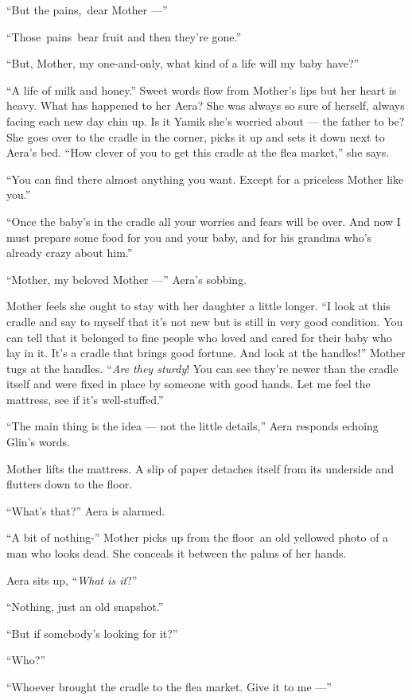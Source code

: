 \documentclass[twoside,11pt]{book}
\begin{document}
``But the pains,~dear Mother ---''

``Those~pains~bear fruit and then they're gone.''

``But, Mother, my one-and-only, what kind of a life will my baby have?''

``A life of milk and honey.'' Sweet words flow from Mother's lips but her heart is heavy. What
has happened to her Aera? She was always so sure of herself, always facing each new day chin up. Is it Yamik she's
worried about --- the father to be? She goes over to the cradle in the corner, picks it up and sets it down next to
Aera's bed. ``How clever of you to get this cradle at the flea market,'' she says.

``You can find there almost anything you want. Except for a priceless Mother like you.''

``Once the baby's in the cradle all your worries and fears will be over. And now I must prepare some food
for you and your baby, and for his grandma who's already crazy about him.''

``Mother, my beloved Mother ---'' Aera's  sobbing.

Mother feels she ought to stay with her daughter a little longer. ``I look at this cradle and say to myself
that it's not new but is{ }still in very good condition. You can tell that it belonged to fine people
who loved and cared for their baby who lay in it. It's a cradle that brings good fortune. And look at the
handles!'' Mother tugs at the handles. ``\textit{Are they sturdy}! You can see they're newer
than the cradle itself and were fixed in place by someone with good hands. Let me feel the mattress, see if it's
well-stuffed.''

``The main thing is the idea --- not the little details,'' Aera responds echoing Glin's words.

Mother lifts the mattress. A slip of paper detaches itself from its underside and{ }flutters down to the
floor.

``What's that?'' Aera is alarmed.

``A bit of nothing-'' Mother picks up from the floor~an old yellowed photo of a man who looks dead. She
conceals{ }it between the palms of her hands.

Aera sits up, ``\textit{What is it}?''

``Nothing, just an old snapshot.''

``But if somebody's looking for it?''

``Who?''

``Whoever brought the cradle to the flea market. Give it to me ---''
\end{document}
